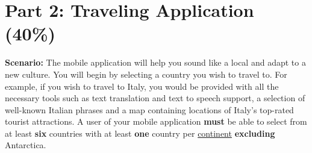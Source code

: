 \documentclass{article}
\begin{document}
\section{Part 2: Traveling Application (40\%)}

\textbf{Scenario:} The mobile application will help you sound like a local and adapt to a new culture. You will begin by selecting a country you wish to travel to. For example, if you wish to travel to Italy, you would be provided with all the necessary tools such as text translation and text to speech support, a selection of well-known Italian phrases and a map containing locations of Italy's top-rated tourist attractions. A user of your mobile application \textbf{must} be able to select from at least \textbf{six} countries with at least \textbf{one} country per \href{https://www.worldometers.info/geography/7-continents/}{continent} \textbf{excluding} Antarctica.
\end{document}
